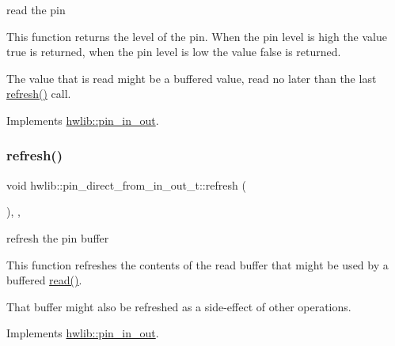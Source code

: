 read the pin

This function returns the level of the pin. When the pin level is high the value true is returned, when the pin level is low the value false is returned.

The value that is read might be a buffered value, read no later than the last \hyperlink{classhwlib_1_1pin__direct__from__in__out__t_aa41926363b1f3f0e64ffdbbca5c9aa2f}{refresh()} call. 

Implements \hyperlink{classhwlib_1_1pin__in__out_a5caebc7ab9fe49b7e020b89f0a2cf892}{hwlib\+::pin\+\_\+in\+\_\+out}.

\mbox{\label{classhwlib_1_1pin__direct__from__in__out__t_aa41926363b1f3f0e64ffdbbca5c9aa2f}} 
\subsubsection{\texorpdfstring{refresh()}{refresh()}}
{\footnotesize\ttfamily void hwlib\+::pin\+\_\+direct\+\_\+from\+\_\+in\+\_\+out\+\_\+t\+::refresh (\begin{DoxyParamCaption}{ }\end{DoxyParamCaption})\hspace{0.3cm}{\ttfamily [inline]}, {\ttfamily [override]}, {\ttfamily [virtual]}}

refresh the pin buffer

This function refreshes the contents of the read buffer that might be used by a buffered \hyperlink{classhwlib_1_1pin__direct__from__in__out__t_a6a77a6c4d2ce69cba2873bdcd087215e}{read()}.

That buffer might also be refreshed as a side-\/effect of other operations. 

Implements \hyperlink{classhwlib_1_1pin__in__out_a8815baac4e5193ec68795956f5e363a6}{hwlib\+::pin\+\_\+in\+\_\+out}.

\mbox{\label{classhwlib_1_1pin__direct__from__in__out__t_a7ef2a3bd8396c92428e353897ab52442}} 
